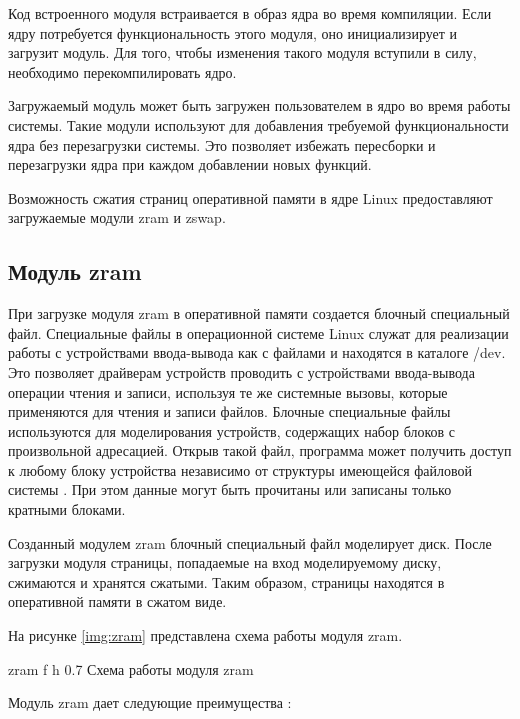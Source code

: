 Код встроенного модуля встраивается в образ ядра во время компиляции. Если ядру потребуется функциональность этого модуля, оно инициализирует и загрузит модуль. Для того, чтобы изменения такого модуля вступили в силу, необходимо перекомпилировать ядро.

Загружаемый модуль может быть загружен пользователем в ядро во время работы системы. Такие модули используют для добавления требуемой функциональности ядра без перезагрузки системы. Это позволяет избежать пересборки и перезагрузки ядра при каждом добавлении новых функций. 

Возможность сжатия страниц оперативной памяти в ядре Linux предоставляют загружаемые модули zram и zswap.

\subsection{Модуль zram}

При загрузке модуля zram в оперативной памяти создается блочный специальный файл. Специальные файлы в операционной системе Linux служат для реализации работы с устройствами ввода-вывода как с файлами и находятся в каталоге /dev. Это позволяет драйверам устройств проводить с устройствами ввода-вывода операции чтения и записи, используя те же системные
вызовы, которые применяются для чтения и записи файлов. Блочные специальные файлы используются для моделирования устройств, содержащих набор блоков с произвольной адресацией. Открыв такой файл, программа может получить доступ к любому блоку устройства независимо от структуры имеющейся файловой системы \cite{block-file}. При этом данные могут быть прочитаны или записаны только кратными блоками.

Созданный модулем zram блочный специальный файл моделирует диск. После загрузки модуля страницы, попадаемые на вход моделируемому диску, сжимаются и хранятся сжатыми. Таким образом, страницы находятся в оперативной памяти в сжатом виде.

На рисунке \ref{img:zram} представлена схема работы модуля zram.

    {zram}
    {f}
    {h}
    {0.7\textwidth}
    {Схема работы модуля zram}

Модуль zram дает следующие преимущества \cite{zram}:

